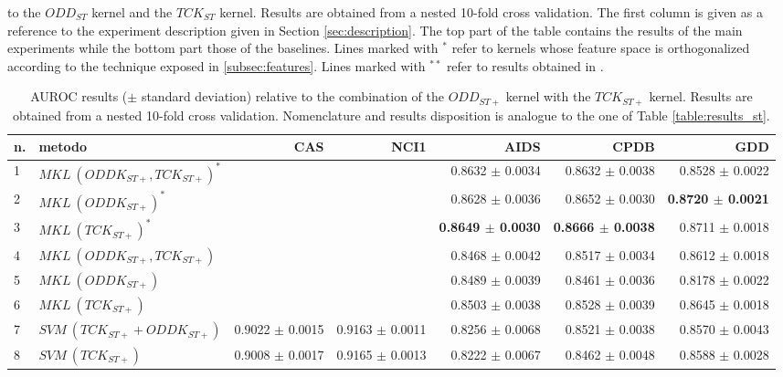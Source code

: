 \begin{landscape}
\begin{table}[ht]
{            to the $ODD_{ST}$ kernel and the $TCK_{ST}$ kernel. Results are
            obtained from a nested 10-fold cross validation. The first column is
            given as a reference to the experiment description given in Section
            \ref{sec:description}.
            The top part of the table contains the results of the main experiments
            while the bottom part those of the baselines.
            Lines marked with $^*$ refer to kernels whose feature space is orthogonalized
            according to the technique exposed in \ref{subsec:features}.
            Lines marked with $^{**}$ refer to results obtained in \cite{gmkl}.
        }
        \label{table:results_st}
        \medskip

        \begin{tabular}{|l|l|r|r|r|r|r|}
            \hline
            n. & metodo&CAS&NCI1&AIDS&CPDB&GDD\\
            \hline
            1& $MKL~(ODDK_{ST+}, TCK_{ST+})^*$&&&0.8632 $\pm$  0.0034&0.8632 $\pm$  0.0038&0.8528 $\pm$ 0.0022\\
            2& $MKL~(ODDK_{ST+})^*$&&&0.8628 $\pm$  0.0036&0.8652 $\pm$ 0.0030&\textbf{0.8720 $\pm$ 0.0021}\\
            3& $MKL~(TCK_{ST+})^*$&&&\textbf{0.8649 $\pm$  0.0030}&\textbf{0.8666 $\pm$  0.0038}&0.8711 $\pm$ 0.0018 \\
            \hline
            4& $MKL~(ODDK_{ST+}, TCK_{ST+})$&&&0.8468 $\pm$ 0.0042&0.8517 $\pm$ 0.0034&0.8612 $\pm$ 0.0018\\
            5& $MKL~(ODDK_{ST+})$&&&0.8489 $\pm$  0.0039&0.8461 $\pm$ 0.0036&0.8178 $\pm$ 0.0022\\
            6& $MKL~(TCK_{ST+})$&&&0.8503 $\pm$  0.0038&0.8528 $\pm$ 0.0039&0.8645 $\pm$ 0.0018\\
            \hline
            7& $SVM~(TCK_{ST+} + ODDK_{ST+})$&0.9022 $\pm$ 0.0015 &0.9163 $\pm$ 0.0011&0.8256 $\pm$ 0.0068&0.8521 $\pm$ 0.0038&0.8570 $\pm$ 0.0043\\
            8& $SVM~(TCK_{ST+})$&0.9008 $\pm$ 0.0017&0.9165 $\pm$ 0.0013&0.8222 $\pm$ 0.0067&0.8462 $\pm$ 0.0048&0.8588 $\pm$ 0.0028\\
            \hline
        \end{tabular}
        \caption{AUROC results ($\pm$ standard deviation) relative to the combination
                of the $ODD_{ST+}$ kernel with the $TCK_{ST+}$ kernel. Results are
                obtained from a nested 10-fold cross validation. Nomenclature and
                results disposition is analogue to the one of Table \ref{table:results_st}.}
        \label{table:results_stp}
    \end{table}


\end{landscape}
